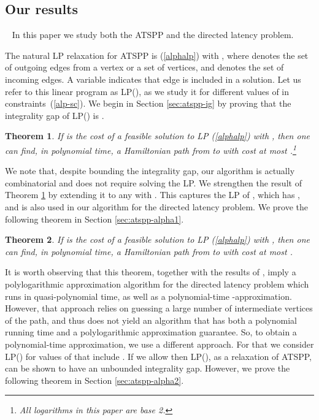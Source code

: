 \documentclass[11pt]{article}
\newtheorem{theorem}{Theorem}[section]
\begin{document}
\subsection{Our results}~
In this paper we study both the ATSPP and the directed latency problem.
\begin{figure}[ht]

\end{figure}
The natural LP relaxation for ATSPP is (\ref{alphalp}) with , where  denotes the set of outgoing edges from a vertex or a set of vertices, and  denotes the set of incoming edges. A variable  indicates that edge  is included in a solution.
Let us refer to this linear program as LP(), 
as we study it for different values of  in constraints~(\ref{alp-sc}). 
We begin in Section \ref{sec:atspp-ig} by proving that the integrality gap of LP() is .


\begin{theorem}\label{thm:ig}
If  is the cost of a feasible solution to LP (\ref{alphalp})
with , then one can find, in polynomial time,
a Hamiltonian path from  to  with cost at most
.\footnote{All logarithms in this paper are base 2.}
\end{theorem}

We note that, despite bounding the integrality gap, our algorithm is actually combinatorial and does not require solving the LP. 
We strengthen the result of Theorem \ref{thm:ig} by extending it to any 
 with . 
This captures the LP of \cite{nagarajan:ravi:latency}, which has , and is also used in our algorithm for the directed latency problem.
We prove the following theorem in Section \ref{sec:atspp-alpha1}.

\begin{theorem}\label{thm:a-ig}
If  is the cost of a feasible solution to LP (\ref{alphalp})
with , then one can find, in polynomial time,
a Hamiltonian path from  to  with  cost at most .
\end{theorem}

It is worth observing that this theorem, together with the results of \cite{nagarajan:ravi:latency}, imply a polylogarithmic approximation algorithm for the directed latency problem which runs in quasi-polynomial time, as well as a polynomial-time -approximation.
However, that approach relies on guessing a large number of intermediate vertices of the path, and thus does not yield an algorithm that has both a polynomial running time and a polylogarithmic approximation guarantee. 
So, to obtain a polynomial-time approximation, we use a different approach. 
For that we consider LP() for values of  that include .
If we allow  then LP(),
as a relaxation of ATSPP, can be shown to have an unbounded integrality gap.
However, we prove the following theorem in Section \ref{sec:atspp-alpha2}.
\end{document}
